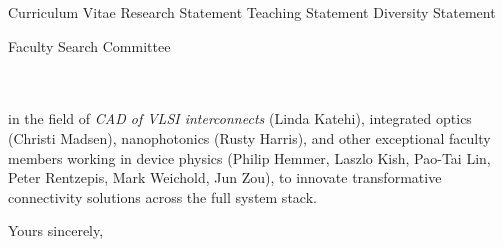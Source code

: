 



\addAttach%
{Curriculum Vitae}%
{Research Statement}%
{Teaching Statement}%
{Diversity Statement}
\def\appSpecific{with significant implications for the research fields related to Device Science and Nanotechnology}
\def\letterCustom{%
    in the field of \emph{CAD of VLSI interconnects} (Linda Katehi), integrated optics (Christi Madsen), nanophotonics (Rusty Harris), and other exceptional faculty members working in device physics (Philip Hemmer, Laszlo Kish, Pao-Tai Lin, Peter Rentzepis, Mark Weichold, Jun Zou), to innovate transformative connectivity solutions across the full system stack.%
}

\def\appJobID{%
    \ifthenelse{\equal{\jobID}{}}{\unskip}{\unskip\textemdash Job \# \jobID{}}%
}
\def\toAddr{%
Faculty Search Committee \\ \appDept{} \\ \appSchool{} \\ \appAddr{}%
}

\begin{letter}{\toAddr{}}
    \opening{\myOpening{}}
    
    \letterCustom{}
    
    \closing{Yours sincerely,}
    \encl{\listAttach{}}
\end{letter}
